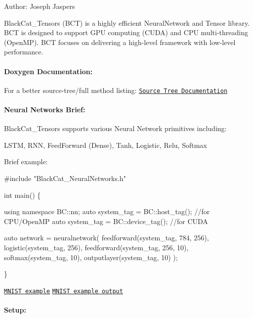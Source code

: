Author\+: Joseph Jaspers

\href{https://travis-ci.org/josephjaspers/BlackCat_Tensors}{\tt }

Black\+Cat\+\_\+\+Tensors (B\+CT) is a highly efficient Neural\+Network and Tensor library. B\+CT is designed to support G\+PU computing (C\+U\+DA) and C\+PU multi-\/threading (Open\+MP). B\+CT focuses on delivering a high-\/level framework with low-\/level performance.

\paragraph*{Doxygen Documentation\+:}

For a better source-\/tree/full method listing\+: \href{https://josephjaspers.github.io/BlackCat_Tensors_Doxygen/html/annotated.html}{\tt Source Tree Documentation}

\paragraph*{Neural Networks Brief\+:}

Black\+Cat\+\_\+\+Tensors supports various Neural Network primitives including\+:

L\+S\+TM, R\+NN, Feed\+Forward (Dense), Tanh, Logistic, Relu, Softmax

Brief example\+: 
\begin{DoxyCode}
\textcolor{preprocessor}{#include "BlackCat\_NeuralNetworks.h"}

\textcolor{keywordtype}{int} main() \{

\textcolor{keyword}{using namespace }BC::nn;
\textcolor{keyword}{auto} system\_tag = BC::host\_tag();   \textcolor{comment}{//for CPU/OpenMP}
\textcolor{keyword}{auto} system\_tag = BC::device\_tag(); \textcolor{comment}{//for CUDA }

\textcolor{keyword}{auto} network = neuralnetwork(
    feedforward(system\_tag, 784, 256),
    logistic(system\_tag, 256),
    feedforward(system\_tag, 256, 10),
    softmax(system\_tag, 10),
    outputlayer(system\_tag, 10)
);

\}
\end{DoxyCode}
 \href{https://github.com/josephjaspers/BlackCat_Tensors/blob/master/examples/mnist_test/mnist_test.h}{\tt M\+N\+I\+ST example} \href{https://travis-ci.org/josephjaspers/BlackCat_Tensors}{\tt M\+N\+I\+ST example output}

\paragraph*{Setup\+:}

